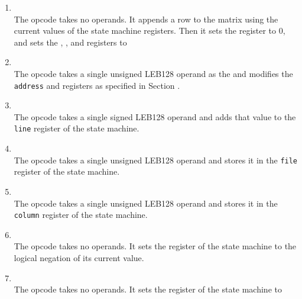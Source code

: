 \begin{enumerate}[1. ]

\item \textbf{\DWLNScopyTARG} \\
The \DWLNScopyNAME{} 
opcode takes no operands. It appends a row
to the matrix using the current values of the state machine
registers. Then it sets the  register to 0,
and sets the , 
\bb{}, 
 and
\eb
registers to 

\item \textbf{\DWLNSadvancepcTARG} \\
The \DWLNSadvancepcNAME{} 
opcode takes a single unsigned LEB128
operand as the  and modifies the \texttt{address}
and  registers as specified in 
Section .

\item \textbf{\DWLNSadvancelineTARG} \\
The \DWLNSadvancelineNAME{} 
opcode takes a single signed LEB128
operand and adds that value to the \texttt{line} register of the
state machine.

\item \textbf{\DWLNSsetfileTARG} \\ 
The \DWLNSsetfileNAME{} opcode takes a single
unsigned LEB128 
operand and stores it in the \texttt{file} register
of the state machine.

\item \textbf{\DWLNSsetcolumnTARG} \\ 
The \DWLNSsetcolumnNAME{} opcode takes a
single unsigned LEB128 operand 
and stores it in the \texttt{column}
register of the state machine.

\item \textbf{\DWLNSnegatestmtTARG} \\
The \DWLNSnegatestmtNAME{} opcode takes no
operands. It sets the  register of the state machine
to the logical negation of its current value.

\item \textbf{\DWLNSsetbasicblockTARG} \\
The \DWLNSsetbasicblockNAME{}
opcode
takes no operands. 
It sets the  register of the
state machine to 


\end{enumerate}
